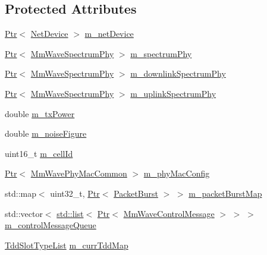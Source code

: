 \subsection*{Protected Attributes}
\begin{DoxyCompactItemize}
\item 
\hyperlink{classns3_1_1Ptr}{Ptr}$<$ \hyperlink{classns3_1_1NetDevice}{Net\+Device} $>$ \hyperlink{classns3_1_1MmWavePhy_a0f14f4e8f7539b06497ba321d9df344c}{m\+\_\+net\+Device}
\item 
\hyperlink{classns3_1_1Ptr}{Ptr}$<$ \hyperlink{classns3_1_1MmWaveSpectrumPhy}{Mm\+Wave\+Spectrum\+Phy} $>$ \hyperlink{classns3_1_1MmWavePhy_a228ee015f63c6e8f33bdf09c8b4cd846}{m\+\_\+spectrum\+Phy}
\item 
\hyperlink{classns3_1_1Ptr}{Ptr}$<$ \hyperlink{classns3_1_1MmWaveSpectrumPhy}{Mm\+Wave\+Spectrum\+Phy} $>$ \hyperlink{classns3_1_1MmWavePhy_aa266d9d20ba903f9adf2695dd626b885}{m\+\_\+downlink\+Spectrum\+Phy}
\item 
\hyperlink{classns3_1_1Ptr}{Ptr}$<$ \hyperlink{classns3_1_1MmWaveSpectrumPhy}{Mm\+Wave\+Spectrum\+Phy} $>$ \hyperlink{classns3_1_1MmWavePhy_a0c65a42f80d7448c933a542342575a36}{m\+\_\+uplink\+Spectrum\+Phy}
\item 
double \hyperlink{classns3_1_1MmWavePhy_ab2c43d2201e609a1c159c534e47788c1}{m\+\_\+tx\+Power}
\item 
double \hyperlink{classns3_1_1MmWavePhy_ac3010f7611906c8dc5e93bc13ff79819}{m\+\_\+noise\+Figure}
\item 
uint16\+\_\+t \hyperlink{classns3_1_1MmWavePhy_a0594531da45f93220d4f5de292bae823}{m\+\_\+cell\+Id}
\item 
\hyperlink{classns3_1_1Ptr}{Ptr}$<$ \hyperlink{classns3_1_1MmWavePhyMacCommon}{Mm\+Wave\+Phy\+Mac\+Common} $>$ \hyperlink{classns3_1_1MmWavePhy_a869abf36bbdbb94eed77ba6e4846f6e4}{m\+\_\+phy\+Mac\+Config}
\item 
std\+::map$<$ uint32\+\_\+t, \hyperlink{classns3_1_1Ptr}{Ptr}$<$ \hyperlink{classns3_1_1PacketBurst}{Packet\+Burst} $>$ $>$ \hyperlink{classns3_1_1MmWavePhy_af741671ef4e7da55b53c69efe7375ab6}{m\+\_\+packet\+Burst\+Map}
\item 
std\+::vector$<$ \hyperlink{openflow-interface_8h_afd9bcfa176617760671b67580f536fa7}{std\+::list}$<$ \hyperlink{classns3_1_1Ptr}{Ptr}$<$ \hyperlink{classns3_1_1MmWaveControlMessage}{Mm\+Wave\+Control\+Message} $>$ $>$ $>$ \hyperlink{classns3_1_1MmWavePhy_ab8d262ef427a0c22ebb614f9991e7ce0}{m\+\_\+control\+Message\+Queue}
\item 
\hyperlink{namespacens3_a74052c5410c5c8e0028017dbf985cd1f}{Tdd\+Slot\+Type\+List} \hyperlink{classns3_1_1MmWavePhy_aa5f58ae1733c976fa40590e7beaeeda2}{m\+\_\+curr\+Tdd\+Map}

\end{DoxyCompactItemize}
